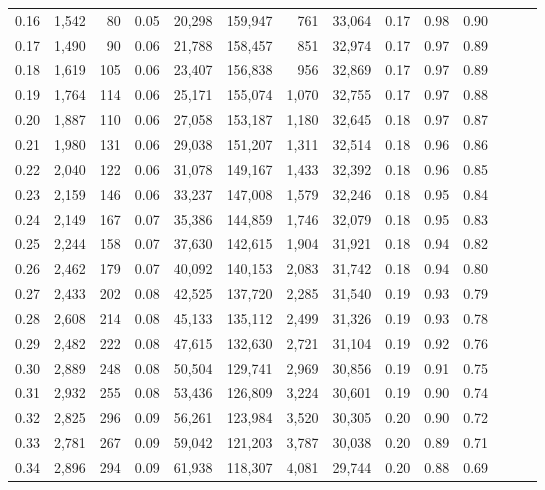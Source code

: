 \begin{tabular}{rrrrrrrrrrrrrr}
0.16 &  1,542 &     80 &  0.05 &   20,298 &  159,947 &     761 &  33,064 &  0.17 &  0.98 &      0.90 \\
0.17 &  1,490 &     90 &  0.06 &   21,788 &  158,457 &     851 &  32,974 &  0.17 &  0.97 &      0.89 \\
0.18 &  1,619 &    105 &  0.06 &   23,407 &  156,838 &     956 &  32,869 &  0.17 &  0.97 &      0.89 \\
0.19 &  1,764 &    114 &  0.06 &   25,171 &  155,074 &   1,070 &  32,755 &  0.17 &  0.97 &      0.88 \\
0.20 &  1,887 &    110 &  0.06 &   27,058 &  153,187 &   1,180 &  32,645 &  0.18 &  0.97 &      0.87 \\
0.21 &  1,980 &    131 &  0.06 &   29,038 &  151,207 &   1,311 &  32,514 &  0.18 &  0.96 &      0.86 \\
0.22 &  2,040 &    122 &  0.06 &   31,078 &  149,167 &   1,433 &  32,392 &  0.18 &  0.96 &      0.85 \\
0.23 &  2,159 &    146 &  0.06 &   33,237 &  147,008 &   1,579 &  32,246 &  0.18 &  0.95 &      0.84 \\
0.24 &  2,149 &    167 &  0.07 &   35,386 &  144,859 &   1,746 &  32,079 &  0.18 &  0.95 &      0.83 \\
0.25 &  2,244 &    158 &  0.07 &   37,630 &  142,615 &   1,904 &  31,921 &  0.18 &  0.94 &      0.82 \\
0.26 &  2,462 &    179 &  0.07 &   40,092 &  140,153 &   2,083 &  31,742 &  0.18 &  0.94 &      0.80 \\
0.27 &  2,433 &    202 &  0.08 &   42,525 &  137,720 &   2,285 &  31,540 &  0.19 &  0.93 &      0.79 \\
0.28 &  2,608 &    214 &  0.08 &   45,133 &  135,112 &   2,499 &  31,326 &  0.19 &  0.93 &      0.78 \\
0.29 &  2,482 &    222 &  0.08 &   47,615 &  132,630 &   2,721 &  31,104 &  0.19 &  0.92 &      0.76 \\
0.30 &  2,889 &    248 &  0.08 &   50,504 &  129,741 &   2,969 &  30,856 &  0.19 &  0.91 &      0.75 \\
0.31 &  2,932 &    255 &  0.08 &   53,436 &  126,809 &   3,224 &  30,601 &  0.19 &  0.90 &      0.74 \\
0.32 &  2,825 &    296 &  0.09 &   56,261 &  123,984 &   3,520 &  30,305 &  0.20 &  0.90 &      0.72 \\
0.33 &  2,781 &    267 &  0.09 &   59,042 &  121,203 &   3,787 &  30,038 &  0.20 &  0.89 &      0.71 \\
0.34 &  2,896 &    294 &  0.09 &   61,938 &  118,307 &   4,081 &  29,744 &  0.20 &  0.88 &      0.69 \\

\end{tabular}
